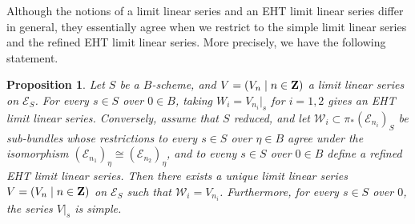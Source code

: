 \documentclass[11pt,reqno]{amsart}
\theoremstyle{plain}
\newtheorem{proposition}[theorem]{Proposition}
\theoremstyle{definition}
\theoremstyle{remark}
\numberwithin{equation}{section}
\numberwithin{equation}{section}
\begin{document}
Although the notions of a limit linear series and an EHT limit linear series differ in general, they essentially agree when we restrict to the simple limit linear series and the refined EHT limit linear series.
More precisely, we have the following statement.
\begin{proposition}\label{prop:llseht}
  Let $S$ be a $B$-scheme, and $V = (V_n \mid n \in {\bf Z})$ a limit linear series on $\mathcal E_S$.
  For every $s \in S$ over $0 \in B$, taking $W_i = V_{n_i}|_s$ for $i = 1, 2$ gives an EHT limit linear series.
  Conversely, assume that $S$ reduced, and let $\mathcal W_i \subset \pi_*(\mathcal E_{n_i})_S$ be sub-bundles whose restrictions to every $s \in S$ over $\eta \in B$ agree under the isomorphism $(\mathcal E_{n_1})_\eta \cong (\mathcal E_{n_2})_\eta$, and to eveny $s \in S$ over $0 \in B$ define a refined EHT limit linear series.
  Then there exists a unique limit linear series $V = (V_n \mid n \in {\bf Z})$ on $\mathcal E_S$ such that $\mathcal W_i = V_{n_i}$.
  Furthermore, for every $s \in S$ over $0$, the series $V|_s$ is simple.
\end{proposition}
\end{document}

